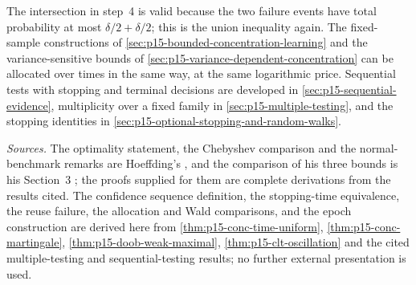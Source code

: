 The intersection in step~4 is valid because the two failure events have
total probability at most \(\delta/2+\delta/2\); this is the union
inequality again. The fixed-sample constructions of
\cref{sec:p15-bounded-concentration-learning} and the variance-sensitive
bounds of \cref{sec:p15-variance-dependent-concentration} can be
allocated over times in the same way, at the same logarithmic price.
Sequential tests with stopping and terminal decisions are developed in
\cref{sec:p15-sequential-evidence}, multiplicity over a fixed family in
\cref{sec:p15-multiple-testing}, and the stopping identities in
\cref{sec:p15-optional-stopping-and-random-walks}.

\emph{Sources.} The optimality statement, the Chebyshev comparison and the
normal-benchmark remarks are Hoeffding's
\cite[pp.~13--15 and~17]{Hoeffding1963BoundedSums}, and the comparison
of his three bounds is his Section~3
\cite[pp.~18--19]{Hoeffding1963BoundedSums}; the proofs supplied
for them are complete derivations from the results cited. The confidence
sequence definition, the stopping-time equivalence, the reuse failure,
the allocation and Wald comparisons, and the epoch construction are
derived here from \cref{thm:p15-conc-time-uniform},
\cref{thm:p15-conc-martingale}, \cref{thm:p15-doob-weak-maximal},
\cref{thm:p15-clt-oscillation} and the cited multiple-testing and
sequential-testing results; no further external presentation is used.
